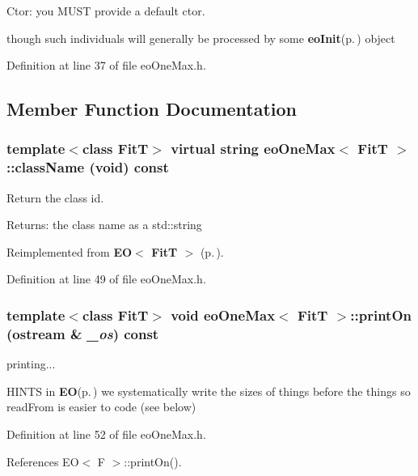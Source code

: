 Ctor: you MUST provide a default ctor. 

though such individuals will generally be processed by some {\bf eo\-Init}{\rm (p.\,\pageref{classeo_init})} object 

Definition at line 37 of file eo\-One\-Max.h.

\subsection{Member Function Documentation}
\subsubsection{\setlength{\rightskip}{0pt plus 5cm}template$<$class Fit\-T$>$ virtual string {\bf eo\-One\-Max}$<$ {\bf Fit\-T} $>$::class\-Name (void) const\hspace{0.3cm}{\tt  [inline, virtual]}}\label{classeo_one_max_a2}


Return the class id. 

\begin{Desc}
\item[Returns:]the class name as a std::string \end{Desc}


Reimplemented from {\bf EO$<$ Fit\-T $>$} {\rm (p.\,\pageref{class_e_o_z10_0})}.

Definition at line 49 of file eo\-One\-Max.h.
\subsubsection{\setlength{\rightskip}{0pt plus 5cm}template$<$class Fit\-T$>$ void {\bf eo\-One\-Max}$<$ {\bf Fit\-T} $>$::print\-On (ostream \& {\em \_\-os}) const\hspace{0.3cm}{\tt  [inline]}}\label{classeo_one_max_a3}


printing... 

HINTS in {\bf EO}{\rm (p.\,\pageref{class_e_o})} we systematically write the sizes of things before the things so read\-From is easier to code (see below)

Definition at line 52 of file eo\-One\-Max.h.

References EO$<$ F $>$::print\-On().
